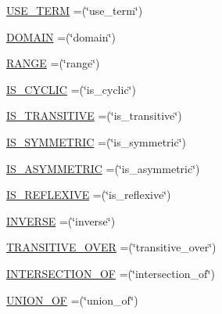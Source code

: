 \begin{DoxyCompactItemize}
\hyperlink{enumorg_1_1coode_1_1owlapi_1_1obo_1_1parser_1_1_o_b_o_vocabulary_ab248c355944ddc7bec4b859fff66d713}{U\-S\-E\-\_\-\-T\-E\-R\-M} =(\char`\"{}use\-\_\-term\char`\"{})
\item 
\hyperlink{enumorg_1_1coode_1_1owlapi_1_1obo_1_1parser_1_1_o_b_o_vocabulary_ab5f5ebde29f3f1553a38cfbcabacb4af}{D\-O\-M\-A\-I\-N} =(\char`\"{}domain\char`\"{})
\item 
\hyperlink{enumorg_1_1coode_1_1owlapi_1_1obo_1_1parser_1_1_o_b_o_vocabulary_ae9904c2fda3b2ad7e3f068cbd1b9234d}{R\-A\-N\-G\-E} =(\char`\"{}range\char`\"{})
\item 
\hyperlink{enumorg_1_1coode_1_1owlapi_1_1obo_1_1parser_1_1_o_b_o_vocabulary_adfdbf7b54c8b2717456a73fdc8b0c00d}{I\-S\-\_\-\-C\-Y\-C\-L\-I\-C} =(\char`\"{}is\-\_\-cyclic\char`\"{})
\item 
\hyperlink{enumorg_1_1coode_1_1owlapi_1_1obo_1_1parser_1_1_o_b_o_vocabulary_a415ebe4fe8658dd739b60826187d9c10}{I\-S\-\_\-\-T\-R\-A\-N\-S\-I\-T\-I\-V\-E} =(\char`\"{}is\-\_\-transitive\char`\"{})
\item 
\hyperlink{enumorg_1_1coode_1_1owlapi_1_1obo_1_1parser_1_1_o_b_o_vocabulary_adff1ad4deb59b2c904e90ae6f28b723f}{I\-S\-\_\-\-S\-Y\-M\-M\-E\-T\-R\-I\-C} =(\char`\"{}is\-\_\-symmetric\char`\"{})
\item 
\hyperlink{enumorg_1_1coode_1_1owlapi_1_1obo_1_1parser_1_1_o_b_o_vocabulary_ae79c8e01bf525f6a2a55f5a0b2edc526}{I\-S\-\_\-\-A\-S\-Y\-M\-M\-E\-T\-R\-I\-C} =(\char`\"{}is\-\_\-asymmetric\char`\"{})
\item 
\hyperlink{enumorg_1_1coode_1_1owlapi_1_1obo_1_1parser_1_1_o_b_o_vocabulary_aa01f6aa304cf9d2c0e295d1b7e7ad96e}{I\-S\-\_\-\-R\-E\-F\-L\-E\-X\-I\-V\-E} =(\char`\"{}is\-\_\-reflexive\char`\"{})
\item 
\hyperlink{enumorg_1_1coode_1_1owlapi_1_1obo_1_1parser_1_1_o_b_o_vocabulary_af9f38c79e2bbb045962b418c19c99fa7}{I\-N\-V\-E\-R\-S\-E} =(\char`\"{}inverse\char`\"{})
\item 
\hyperlink{enumorg_1_1coode_1_1owlapi_1_1obo_1_1parser_1_1_o_b_o_vocabulary_a02d8188c9e598ebc63f6ac2fa87f6d35}{T\-R\-A\-N\-S\-I\-T\-I\-V\-E\-\_\-\-O\-V\-E\-R} =(\char`\"{}transitive\-\_\-over\char`\"{})
\item 
\hyperlink{enumorg_1_1coode_1_1owlapi_1_1obo_1_1parser_1_1_o_b_o_vocabulary_a400d8371210c2d07d8337f959bb7a52e}{I\-N\-T\-E\-R\-S\-E\-C\-T\-I\-O\-N\-\_\-\-O\-F} =(\char`\"{}intersection\-\_\-of\char`\"{})
\item 
\hyperlink{enumorg_1_1coode_1_1owlapi_1_1obo_1_1parser_1_1_o_b_o_vocabulary_a8c2c809c15fb9c9f24a39068dde08053}{U\-N\-I\-O\-N\-\_\-\-O\-F} =(\char`\"{}union\-\_\-of\char`\"{})

\end{DoxyCompactItemize}
